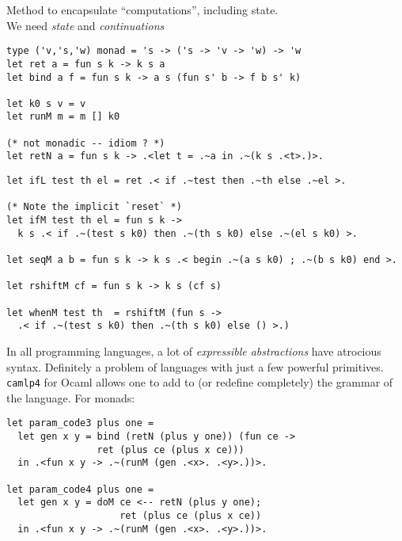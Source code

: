 \documentclass[landscape]{slides}
\begin{document}
\begin{slide}
    Method to encapsulate ``computations'', including state.\\
    We need \emph{state} and \emph{continuations}
\begin{verbatim}
type ('v,'s,'w) monad = 's -> ('s -> 'v -> 'w) -> 'w
let ret a = fun s k -> k s a
let bind a f = fun s k -> a s (fun s' b -> f b s' k)

let k0 s v = v
let runM m = m [] k0

(* not monadic -- idiom ? *)
let retN a = fun s k -> .<let t = .~a in .~(k s .<t>.)>.
\end{verbatim}
\end{slide}

\begin{slide}
\begin{verbatim}
let ifL test th el = ret .< if .~test then .~th else .~el >.

(* Note the implicit `reset` *)
let ifM test th el = fun s k ->
  k s .< if .~(test s k0) then .~(th s k0) else .~(el s k0) >.

let seqM a b = fun s k -> k s .< begin .~(a s k0) ; .~(b s k0) end >.

let rshiftM cf = fun s k -> k s (cf s)

let whenM test th  = rshiftM (fun s -> 
  .< if .~(test s k0) then .~(th s k0) else () >.)
\end{verbatim}
\end{slide}

\begin{slide}
    In all programming languages, a lot of \emph{expressible abstractions}
    have atrocious syntax.  Definitely a problem of languages with
    just a few powerful primitives. \texttt{camlp4} for Ocaml allows one to add
    to (or redefine completely) the grammar of the language.  For monads:
\begin{verbatim}
let param_code3 plus one =
  let gen x y = bind (retN (plus y one)) (fun ce -> 
                ret (plus ce (plus x ce)))
  in .<fun x y -> .~(runM (gen .<x>. .<y>.))>.

let param_code4 plus one =
  let gen x y = doM ce <-- retN (plus y one);
                    ret (plus ce (plus x ce))
  in .<fun x y -> .~(runM (gen .<x>. .<y>.))>.
\end{verbatim}
\end{slide}
\end{document}
